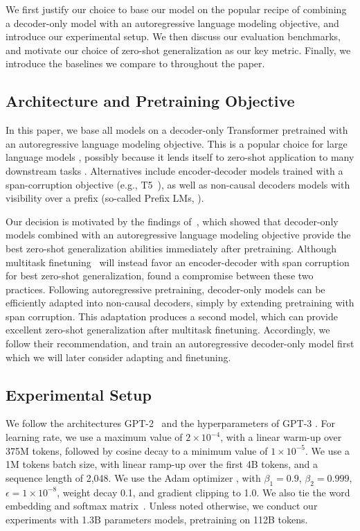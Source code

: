 We first justify our choice to base our model on the popular recipe of combining a decoder-only model with an autoregressive language modeling objective, and introduce our experimental setup. We then discuss our evaluation benchmarks, and motivate our choice of zero-shot generalization as our key metric. Finally, we introduce the baselines we compare to throughout the paper.

\subsection{Architecture and Pretraining Objective}
\label{sec:t5x}

In this paper, we base all models on a decoder-only Transformer pretrained with an autoregressive language modeling objective. This is a popular choice for large language models \cite{brown2020gpt3, rae2021scaling, thoppilan2022lamda}, possibly because it lends itself to zero-shot application to many downstream tasks \cite{radford2019language}. Alternatives include encoder-decoder models trained with a span-corruption objective (e.g., T5~\citet{raffel2019t5}), as well as non-causal decoders models with visibility over a prefix (so-called Prefix LMs, \citet{liu2018generating, dong2019unified}).   

Our decision is motivated by the findings of~\citet{wang2022language}, which showed that decoder-only models combined with an autoregressive language modeling objective provide the best zero-shot generalization abilities immediately after pretraining. Although multitask finetuning~\cite{Sanh2021MultitaskPT,wei2021finetuned} will instead favor an encoder-decoder with span corruption for best zero-shot generalization, \citet{wang2022language} found a compromise between these two practices. Following autoregressive pretraining, decoder-only models can be efficiently adapted into non-causal decoders, simply by extending pretraining with span corruption. This adaptation produces a second model, which can provide excellent zero-shot generalization after multitask finetuning. Accordingly, we follow their recommendation, and train an autoregressive decoder-only model first which we will later consider adapting and finetuning. 

\subsection{Experimental Setup} 
We follow the architectures GPT-2~\citep{radford2019language} and the hyperparameters of GPT-3 \citep{brown2020gpt3}. For learning rate, we use a maximum value of $2 \times 10^{-4}$, with a linear warm-up over 375M tokens, followed by cosine decay to a minimum value of $1 \times 10^{-5}$. We use a 1M tokens batch size, with linear ramp-up over the first 4B tokens, and a sequence length of 2,048. We use the Adam optimizer \cite{kingma2014adam}, with $\beta_1=0.9$, $\beta_2=0.999$, $\epsilon=1 \times 10^{-8}$, weight decay 0.1, and gradient clipping to 1.0. We also tie the word embedding and softmax matrix~\citep{tying}. Unless noted otherwise, we conduct our experiments with 1.3B parameters models, pretraining on 112B tokens. 

